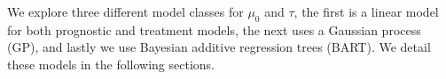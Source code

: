 \documentclass[12pt, a4paper]{article}
\begin{document}
We explore three different model classes for $\mu_0$ and $\tau$, the first is a
linear model for both prognostic and treatment models, the next uses a Gaussian
process (GP), and lastly we use Bayesian additive regression trees (BART). We 
detail these models in the following sections. 





\end{document}
